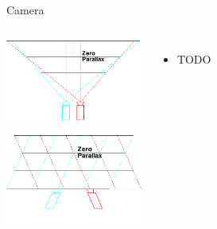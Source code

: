 \documentclass[12pt,ucs,hyperref={pdftext}]{beamer}
\newlength{\columnleft}
\newlength{\columnright}
\begin{document}
\begin{frame}{Camera}
\begin{columns}

\column{\columnleft}

\begin{center}
\includegraphics[width=4.5cm]{media/camera-perspective.pdf}

\bigskip

\includegraphics[width=4.5cm]{media/camera-parallel.pdf}
\end{center}

\column{\columnright}
\begin{itemize}%
\item TODO
\end{itemize}

\end{columns}
\end{frame}
\end{document}
